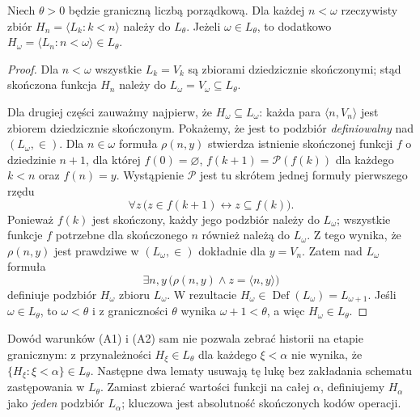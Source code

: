 \begin{lemat}
\label{lem:l-initial-history-omega-77}
Niech $\theta>0$ będzie graniczną liczbą porządkową.
Dla każdej $n<\omega$ rzeczywisty zbiór
$H_n=\langle L_k:k<n\rangle$ należy do $L_\theta$.
Jeżeli $\omega\in L_\theta$, to dodatkowo
$H_\omega=\langle L_n:n<\omega\rangle\in L_\theta$.
\end{lemat}
\begin{proof}
Dla $n<\omega$ wszystkie $L_k=V_k$ są zbiorami
dziedzicznie skończonymi; stąd skończona funkcja
$H_n$ należy do $L_\omega=V_\omega\subseteq L_\theta$.

Dla drugiej części zauważmy najpierw, że
$H_\omega\subseteq L_\omega$:
każda para $\langle n,V_n\rangle$ jest
zbiorem dziedzicznie skończonym.
Pokażemy, że jest to podzbiór
\emph{definiowalny} nad $(L_\omega,\in)$.
Dla $n\in\omega$ formuła $\rho(n,y)$ stwierdza
istnienie skończonej funkcji $f$ o dziedzinie
$n+1$, dla której $f(0)=\varnothing$,
$f(k+1)=\mathcal P(f(k))$ dla każdego $k<n$
oraz $f(n)=y$. Wystąpienie $\mathcal P$ jest
tu skrótem jednej formuły pierwszego rzędu
\[
\forall z\,\bigl(z\in f(k+1)\longleftrightarrow
                 z\subseteq f(k)\bigr).
\]
Ponieważ $f(k)$ jest skończony, każdy jego
podzbiór należy do $L_\omega$; wszystkie
funkcje $f$ potrzebne dla skończonego $n$
również należą do $L_\omega$.
Z tego wynika, że $\rho(n,y)$ jest prawdziwe
w $(L_\omega,\in)$ dokładnie dla $y=V_n$.
Zatem nad $L_\omega$ formuła
\[
\exists n,y\,\bigl(\rho(n,y)\land
  z=\langle n,y\rangle\bigr)
\]
definiuje podzbiór $H_\omega$ zbioru $L_\omega$.
W rezultacie
$H_\omega\in\operatorname{Def}(L_\omega)
=L_{\omega+1}$.
Jeśli $\omega\in L_\theta$, to $\omega<\theta$
i z graniczności $\theta$ wynika
$\omega+1<\theta$, a więc $H_\omega\in L_\theta$.
\end{proof}

\begin{uwaga}
\label{rem:l-adequacy-remaining-history-77}
Dowód warunków (A1) i (A2) sam nie pozwala zebrać
historii na etapie granicznym: z przynależności
$H_\xi\in L_\theta$ dla każdego $\xi<\alpha$ nie wynika,
że $\{H_\xi:\xi<\alpha\}\in L_\theta$.
Następne dwa lematy usuwają tę lukę bez zakładania
schematu zastępowania w $L_\theta$. Zamiast zbierać
wartości funkcji na całej $\alpha$, definiujemy
$H_\alpha$ jako \emph{jeden} podzbiór $L_\alpha$;
kluczowa jest absolutność skończonych kodów operacji.
\end{uwaga}

